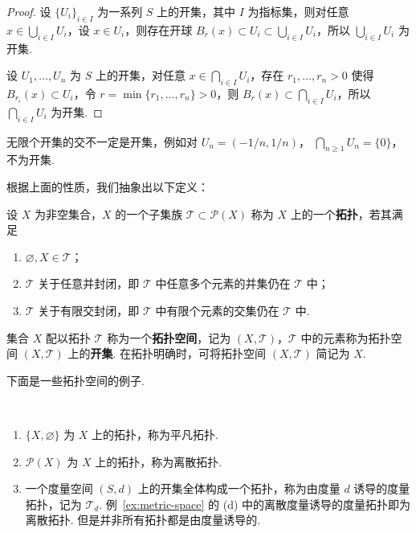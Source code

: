 \documentclass[../main.tex]{subfiles}
\begin{document}
\begin{proof}
    设 $\{U_i\}_{i \in I}$ 为一系列 $S$ 上的开集，其中 $I$ 为指标集，则对任意 $x \in \bigcup\limits_{i \in I} U_i$，设 $x \in U_i$，则存在开球 $B_r(x) \subset U_i \subset \bigcup\limits_{i \in I} U_i$，所以 $\bigcup\limits_{i \in I} U_i$ 为开集. 

    设 $U_1, \dots, U_n$ 为 $S$ 上的开集，对任意 $x \in \bigcap\limits_{i \in I} U_i$，存在 $r_1, \dots, r_n > 0$ 使得 $B_{r_i}(x) \subset U_i$，令 $r = \min\{r_1, \dots, r_n\} > 0$，则 $B_r(x) \subset \bigcap\limits_{i \in I} U_i$，所以 $\bigcap\limits_{i \in I} U_i$ 为开集. 
\end{proof}

\begin{remark}
    无限个开集的交不一定是开集，例如对 $U_n = (-1 / n, 1 / n)$， $\bigcap\limits_{n \geqslant 1} U_n = \{0\}$，不为开集. 
\end{remark}

根据上面的性质，我们抽象出以下定义：

\begin{definition}[拓扑与拓扑空间的定义]
    设 $X$ 为非空集合，$X$ 的一个子集族 $\mathcal{T} \subset \mathcal{P}(X)$ 称为 $X$ 上的一个\textbf{拓扑}，若其满足
    \begin{enumerate}[label=(\alph*)]
        \item $\varnothing, X \in \mathcal{T}$；
        \item $\mathcal{T}$ 关于任意并封闭，即 $\mathcal{T}$ 中任意多个元素的并集仍在 $\mathcal{T}$ 中；
        \item $\mathcal{T}$ 关于有限交封闭，即 $\mathcal{T}$ 中有限个元素的交集仍在 $\mathcal{T}$ 中. 
    \end{enumerate}
    集合 $X$ 配以拓扑 $\mathcal{T}$ 称为一个\textbf{拓扑空间}，记为 $(X, \mathcal{T})$，$\mathcal{T}$ 中的元素称为拓扑空间 $(X, \mathcal{T})$ 上的\textbf{开集}. 在拓扑明确时，可将拓扑空间 $(X, \mathcal{T})$ 简记为 $X$. 
\end{definition}

下面是一些拓扑空间的例子. 

\begin{example}[拓扑空间的例子]
    \ 
    \begin{enumerate}[label=(\alph*)]
        \item $\{X, \varnothing\}$ 为 $X$ 上的拓扑，称为平凡拓扑. 
        \item $\mathcal{P}(X)$ 为 $X$ 上的拓扑，称为离散拓扑. 
        \item 一个度量空间 $(S, d)$ 上的开集全体构成一个拓扑，称为由度量 $d$ 诱导的度量拓扑，记为 $\mathcal{T}_d$. 例~\ref{ex:metric-space} 的 (d) 中的离散度量诱导的度量拓扑即为离散拓扑. 但是并非所有拓扑都是由度量诱导的. 
    \end{enumerate}
\end{example}
\end{document}

